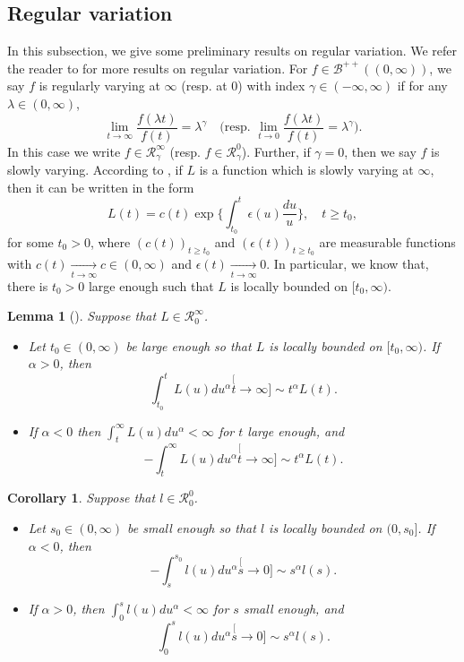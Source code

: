 \documentclass[12pt, a4paper]{amsart}
\newtheorem{lem}[thm]{Lemma}
\newtheorem{cro}[thm]{Corollary}
\theoremstyle{definition}
\numberwithin{equation}{section}
\begin{document}
\subsection{Regular variation}
\label{sec: Regularly variation}
	In this subsection, we give some preliminary results on regular variation.
	We refer the reader to \cite{BinghamGoldieTeugels1989Regular} for more results on  regular variation.
	For $f\in \mathscr B^{++}((0,\infty))$, we say $f$ is regularly varying at $\infty$ (resp. at $0$) with index $\gamma \in (-\infty,\infty)$ if for any $\lambda \in (0,\infty)$,
\[
	\lim_{t\to\infty}\frac{f(\lambda t)}{f(t)}
	= \lambda^\gamma
	\quad \Big(\text{resp. } \lim_{t\to 0}\frac{f(\lambda t)}{f(t)}
	= \lambda^\gamma\Big).
\]
In this case we write  $f\in \mathcal R^\infty_\gamma$ (resp. $f\in \mathcal R^0_\gamma$).
	Further, if $\gamma = 0$,
	then we say $f$ is slowly varying.
	According to \cite[Theorem 1.3.1.]{BinghamGoldieTeugels1989Regular}, if $L$ is a function which is slowly varying at $\infty$, then it can be written in the form
\[
	L(t)
	= c(t) \exp\Big\{\int_{t_0}^t \epsilon(u) \frac{du}{u}\Big\},\quad t\geq t_0,
\]
	for some $t_0>0$, where $(c(t))_{t\geq t_0}$ and $(\epsilon(t))_{t\geq t_0}$ are measurable functions with $c(t) \xrightarrow[t\to \infty]{} c \in (0,\infty)$ and $\epsilon(t) \xrightarrow[t\to \infty]{} 0$.
	In particular, we know that, there is $t_0 > 0$ large enough such that $L$ is locally bounded on $[t_0,\infty)$.

\begin{lem}[{\cite[Propositions 1.5.8. and 1.5.10]{BinghamGoldieTeugels1989Regular}}]
\label{lem: exchange slowly varying function and integration}
	Suppose that $L\in \mathcal R^\infty_0$.
\begin{itemize}
\item
	Let $t_0\in (0,\infty)$ be large enough so that $L$ is locally bounded on $[t_0,\infty)$. If $\alpha>0 $, then
\[
	\int_{t_0}^t L(u)du^\alpha
	\stackrel[t\to \infty]{}{\sim} t^\alpha L(t).
\]
\item
	If $\alpha< 0$ then $\int_t^\infty L(u) du^\alpha < \infty$ for $t$ large enough, and
\[
	-\int_t^\infty L(u)du^\alpha
	\stackrel[t\to \infty]{}{\sim} t^\alpha L(t).
\]
\end{itemize}
\end{lem}

\begin{cro}
\label{cro: power law and ingetration}
	Suppose that $l\in \mathcal R^0_0$.
\begin{itemize}
\item
	Let $s_0\in (0,\infty)$ be small enough so that $l$ is locally bounded on $(0,s_0]$.
	If $\alpha < 0$, then
	\[
	-\int_s^{s_0} l(u)du^\alpha
	\stackrel[s\to 0]{}{\sim} s^{\alpha} l(s).
	\]
\item
	If $\alpha > 0$, then $\int_0^s l(u)du^\alpha<\infty$ for $s$ small enough, and
\[
	\int_0^s l(u)du^\alpha
	\stackrel[s\to 0]{}{\sim} s^{\alpha} l(s).
\]
\end{itemize}
\end{cro}	
\end{document}
